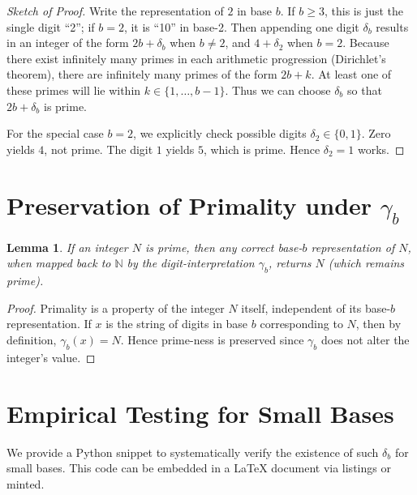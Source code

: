 \documentclass[11pt]{article}
\newtheorem{lemma}{Lemma}
\begin{document}
\begin{proof}[Sketch of Proof]
Write the representation of $2$ in base $b$. If $b \ge 3$, this is just the single digit ``2''; 
if $b=2$, it is ``10'' in base-2. Then appending one digit $\delta_b$ results in an integer 
of the form $2b + \delta_b$ when $b\neq 2$, and $4 + \delta_2$ when $b=2$. 
Because there exist infinitely many primes in each arithmetic progression (Dirichlet's theorem), 
there are infinitely many primes of the form $2b + k$. At least one of these primes will lie 
within $k \in \{1,\dots,b-1\}$. Thus we can choose $\delta_b$ so that $2b + \delta_b$ is prime.

For the special case $b=2$, we explicitly check possible digits $\delta_2 \in \{0,1\}$. 
Zero yields $4$, not prime. The digit $1$ yields $5$, which is prime. 
Hence $\delta_2 = 1$ works.
\end{proof}

\section{Preservation of Primality under \texorpdfstring{$\gamma_b$}{gb}}
\begin{lemma}
If an integer $N$ is prime, then any correct base-$b$ representation of $N$, 
when mapped back to $\mathbb{N}$ by the digit-interpretation $\gamma_b$, returns $N$ (which remains prime).
\end{lemma}

\begin{proof}
Primality is a property of the integer $N$ itself, independent of its base-$b$ representation. 
If $x$ is the string of digits in base $b$ corresponding to $N$, then by definition, 
$\gamma_b(x) = N$. Hence prime-ness is preserved since $\gamma_b$ does not alter the integer's value.
\end{proof}

\section{Empirical Testing for Small Bases}
We provide a Python snippet to systematically verify the existence of such $\delta_b$ for small bases. 
This code can be embedded in a \LaTeX{} document via listings or minted.
\end{document}
